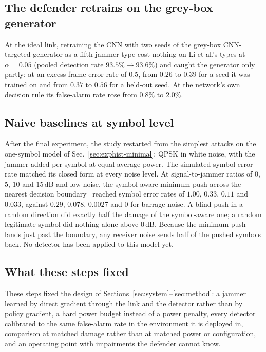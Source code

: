 \subsection{The defender retrains on the grey-box generator}
At the ideal link, retraining the CNN with two seeds of the grey-box CNN-targeted generator as a fifth jammer type cost nothing on Li et al.'s types at $\alpha=0.05$ (pooled detection rate $93.5\%\to93.6\%$) and caught the generator only partly: at an excess frame error rate of $0.5$, from $0.26$ to $0.39$ for a seed it was trained on and from $0.37$ to $0.56$ for a held-out seed.
At the network's own decision rule its false-alarm rate rose from $0.8\%$ to $2.0\%$.

\subsection{Naive baselines at symbol level}
After the final experiment, the study restarted from the simplest attacks on the one-symbol model of Sec.~\ref{sec:exphist-minimal}: QPSK in white noise, with the jammer added per symbol at equal average power.
The simulated symbol error rate matched its closed form at every noise level.
At signal-to-jammer ratios of $0$, $5$, $10$ and $15$\,dB and low noise, the symbol-aware minimum push across the nearest decision boundary~\cite{xie2022adversarial} reached symbol error rates of $1.00$, $0.33$, $0.11$ and $0.033$, against $0.29$, $0.078$, $0.0027$ and $0$ for barrage noise.
A blind push in a random direction did exactly half the damage of the symbol-aware one; a random legitimate symbol did nothing alone above $0$\,dB.
Because the minimum push lands just past the boundary, any receiver noise sends half of the pushed symbols back.
No detector has been applied to this model yet.

\subsection*{What these steps fixed}
These steps fixed the design of Sections~\ref{sec:system}--\ref{sec:method}: a jammer learned by direct gradient through the link and the detector rather than by policy gradient, a hard power budget instead of a power penalty, every detector calibrated to the same false-alarm rate in the environment it is deployed in, comparison at matched damage rather than at matched power or configuration, and an operating point with impairments the defender cannot know.
